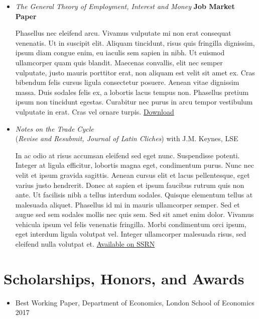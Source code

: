 \documentclass{article}[12]
\begin{document}
\begin{itemize}[itemsep=1.5em]

\item \emph{The General Theory of Employment, Interest and Money} \hfill \textbf{Job Market Paper}

Phasellus nec eleifend arcu. Vivamus vulputate mi non erat consequat venenatis. Ut in suscipit elit. Aliquam tincidunt, risus quis fringilla dignissim, ipsum diam congue enim, eu iaculis sem sapien in nibh. Ut euismod ullamcorper quam quis blandit. Maecenas convallis, elit nec semper vulputate, justo mauris porttitor erat, non aliquam est velit sit amet ex. Cras bibendum felis cursus ligula consectetur posuere. Aenean vitae dignissim massa. Duis sodales felis ex, a lobortis lacus tempus non. Phasellus pretium ipsum non tincidunt egestas. Curabitur nec purus in arcu tempor vestibulum vulputate in erat. Cras vel ornare turpis. \href{http://my-great-site.com/files/somepaper.pdf}{Download}

\item \emph{Notes on the Trade Cycle}
\\ (\emph{Revise and Resubmit, \emph{Journal of Latin Cliches}}) with J.M. Keynes, LSE

In ac odio at risus accumsan eleifend sed eget nunc. Suspendisse potenti. Integer at ligula efficitur, lobortis magna eget, condimentum purus. Nunc nec velit et ipsum gravida sagittis. Aenean cursus elit et lacus pellentesque, eget varius justo hendrerit. Donec at sapien et ipsum faucibus rutrum quis non ante. Ut facilisis nibh a tellus interdum sodales. Quisque elementum tellus at malesuada aliquet. Phasellus id mi in mauris ullamcorper semper. Sed et augue sed sem sodales mollis nec quis sem. Sed sit amet enim dolor. Vivamus vehicula ipsum vel felis venenatis fringilla. Morbi condimentum orci ipsum, eget interdum ligula volutpat vel. Integer ullamcorper malesuada risus, sed eleifend nulla volutpat et. \href{http://my-great-site.com/files/somepaper.pdf}{Available on SSRN}

\end{itemize}

\section{Scholarships, Honors, and Awards}

\begin{itemize}   
    \item Best Working Paper, Department of Economics, London School of Economics \hfill 2017
\end{itemize}
\end{document}
